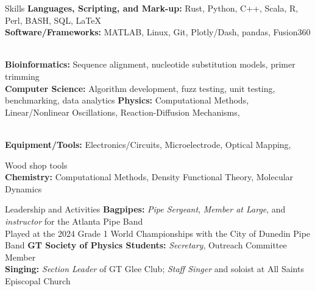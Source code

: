 \documentclass{resume} %
\begin{document}
\begin{rSection}{Skills}
  \textbf{Languages, Scripting, and Mark-up:} Rust, Python, C++, Scala, R, Perl, BASH, SQL, LaTeX \\
  \textbf{Software/Frameworks:} MATLAB, Linux, Git, Plotly/Dash, pandas, Fusion360 \\
  \textbf{Bioinformatics:} Sequence alignment, nucleotide substitution models, primer trimming \\
  \textbf{Computer Science:} Algorithm development, fuzz testing, unit testing, benchmarking, data analytics
  \textbf{Physics:} Computational Methods, Linear/Nonlinear Oscillations, Reaction-Diffusion Mechanisms,\\
  \textbf{Equipment/Tools:} Electronics/Circuits, Microelectrode, Optical Mapping, Wood shop tools\\
  \textbf{Chemistry:} Computational Methods, Density Functional Theory, Molecular Dynamics 
\end{rSection}
\begin{rSection}{Leadership and Activities}
  \textbf{Bagpipes:} \textit{Pipe Sergeant}, \textit{Member at Large}, and \textit{instructor} for the Atlanta Pipe Band \\
  \-\hspace{2cm} Played at the 2024 Grade 1 World Championships with the City of Dunedin Pipe Band
  \textbf{GT Society of Physics Students:} \textit{Secretary}, Outreach Committee Member \\
  \textbf{Singing:} \textit{Section Leader} of GT Glee Club; \textit{Staff Singer} and soloist at All Saints Episcopal Church  \\

\end{rSection}
\end{document}
